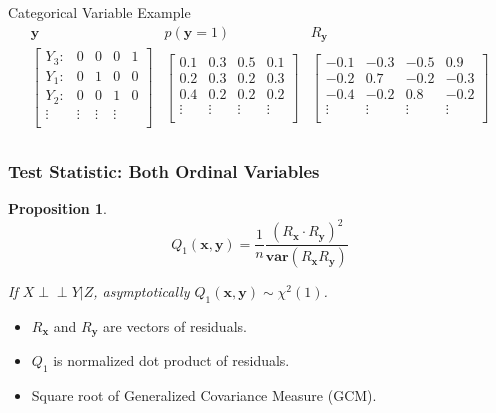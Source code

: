 \documentclass{beamer}
\def\ci{\perp\!\!\!\!\!\perp}
\newtheorem{proposition}{Proposition}
\begin{document}
\begin{frame}
	\begin{block}{Categorical Variable Example}
		\begin{equation*}
		\begin{array}{ccc}
			\bm{y} & \hat{p}(\bm{y}=1) & R_{\bm{y}} \\
			\begin{bmatrix}
				Y_3: & 0 & 0 & 0 & 1 \\
				Y_1: & 0 & 1 & 0 & 0 \\
				Y_2: & 0 & 0 & 1 & 0 \\
				\vdots & \vdots & \vdots & \vdots \\
			\end{bmatrix} & 
			\begin{bmatrix}
				0.1 & 0.3 & 0.5 & 0.1 \\
				0.2 & 0.3 & 0.2 & 0.3 \\
				0.4 & 0.2 & 0.2 & 0.2 \\
				\vdots & \vdots & \vdots & \vdots \\
			\end{bmatrix} & 
			\begin{bmatrix}
				-0.1 & -0.3 & -0.5 & 0.9 \\
				-0.2 & 0.7 & -0.2& -0.3 \\
				-0.4 & -0.2 & 0.8 & -0.2 \\
				\vdots & \vdots & \vdots & \vdots \\
			\end{bmatrix} \\
		\end{array}
		\end{equation*}	
	\end{block}
\end{frame}

\begin{frame}
	\frametitle{Test Statistic: Both Ordinal Variables}
	\begin{proposition}
	$$ Q_1(\bm{x}, \bm{y}) = \frac{1}{n} \frac{(R_{\bm{x}} \cdot R_{\bm{y}})^2}{\bm{var}(R_{\bm{x}} R_{\bm{y}})} $$
		\begin{center} If $ X \ci Y | Z $, asymptotically $ Q_1(\bm{x}, \bm{y}) \sim \chi^2(1) $. \end{center}
	\end{proposition}
	\begin{center}
		\begin{itemize}
			\item $ R_{\bm{x}} $ and $ R_{\bm{y}} $ are vectors of residuals.
			\item $ Q_1 $ is normalized dot product of residuals.
			\item Square root of Generalized Covariance Measure (GCM)\footnotemark.
		\end{itemize}
	\end{center}
\end{frame}
\end{document}
